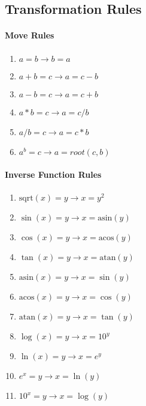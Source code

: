 \documentclass{article}
\begin{document}
\subsection{Transformation Rules}
\paragraph{Move Rules}
\begin{enumerate}
\item $a=b \rightarrow b=a$
\item $a+b=c \rightarrow a=c-b$
\item $a-b=c \rightarrow a=c+b$
\item $a*b=c \rightarrow a=c/b$
\item $a/b=c \rightarrow a=c*b$
\item $a^b=c \rightarrow a=root(c, b)$
\end{enumerate}
\paragraph{Inverse Function Rules}
\begin{enumerate}
\item $\text{sqrt}(x)=y \rightarrow x=y^2$
\item $\sin(x)=y \rightarrow x=\text{asin}(y)$
\item $\cos(x)=y \rightarrow x=\text{acos}(y)$
\item $\tan(x)=y \rightarrow x=\text{atan}(y)$
\item $\text{asin}(x)=y \rightarrow x=\sin(y)$
\item $\text{acos}(x)=y \rightarrow x=\cos(y)$
\item $\text{atan}(x)=y \rightarrow x=\tan(y)$
\item $\log(x) = y \rightarrow x = 10^y$
\item $\ln(x) = y \rightarrow x = e^y$
\item $e^x = y \rightarrow x = \ln(y)$
\item $10^x = y \rightarrow x = \log(y)$
\end{enumerate}
\end{document}
